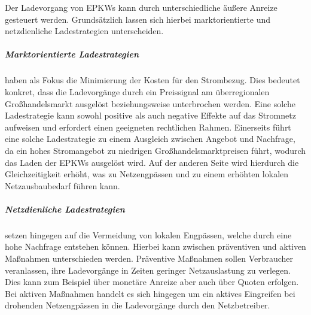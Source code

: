 Der Ladevorgang von \glspl{EPKW} kann durch unterschiedliche äußere Anreize gesteuert werden.
Grundsätzlich lassen sich hierbei marktorientierte und netzdienliche Ladestrategien unterscheiden.


\subparagraph{Marktorientierte Ladestrategien} haben als Fokus die Minimierung der Kosten für den Strombezug. Dies bedeutet konkret, dass die Ladevorgänge durch ein Preissignal am überregionalen Großhandelsmarkt ausgelöst beziehungsweise unterbrochen werden.
Eine solche Ladestrategie kann sowohl positive als auch negative Effekte auf das Stromnetz aufweisen und erfordert einen geeigneten rechtlichen Rahmen.
Einerseits führt eine solche Ladestrategie zu einem Ausgleich zwischen Angebot und Nachfrage, da ein hohes Stromangebot zu niedrigen Großhandelsmarktpreisen führt, wodurch das Laden der \glspl{EPKW} ausgelöst wird.
Auf der anderen Seite wird hierdurch die Gleichzeitigkeit erhöht, was zu Netzengpässen und zu einem erhöhten lokalen Netzausbaubedarf führen kann. \cite{Agora2019} \cite{Dorendorf2019} \cite{Rehtanz2017}


\subparagraph{Netzdienliche Ladestrategien} setzen hingegen auf die Vermeidung von lokalen Engpässen, welche durch eine hohe Nachfrage entstehen können.
Hierbei kann zwischen präventiven und aktiven Maßnahmen unterschieden werden.
Präventive Maßnahmen sollen Verbraucher veranlassen, ihre Ladevorgänge in Zeiten geringer Netzauslastung zu verlegen.
Dies kann zum Beispiel über monetäre Anreize aber auch über Quoten erfolgen.
Bei aktiven Maßnahmen handelt es sich hingegen um ein aktives Eingreifen bei drohenden Netzengpässen in die Ladevorgänge durch den Netzbetreiber. \cite{Agora2019}


\clearpage
